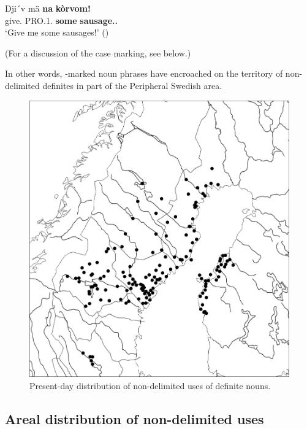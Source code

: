 \z

\ea
\gll Dji´v  mä  \textbf{na} \textbf{  kòrvom!}\\
give.{\imp}  PRO.1{\sg}.{\obl}  \textbf{some} \textbf{sausage.{\dat}.{\pl}}\\
\glt ‘Give me some sausages!’ (\citet[19]{Brännström1993})

\z

(For a discussion of the case marking, see  below.) 

In other words, -marked noun phrases have encroached on the territory of non-delimited definites in part of the Peripheral Swedish area. 

\begin{figure}[h]
\includegraphics[height=.5\textheight]{figures/13_PresentDayDistribution}
\caption{Present-day distribution of non-delimited uses of definite nouns.}
\label{map:11}

\end{figure}

\subsection{ Areal distribution of non-delimited uses}

